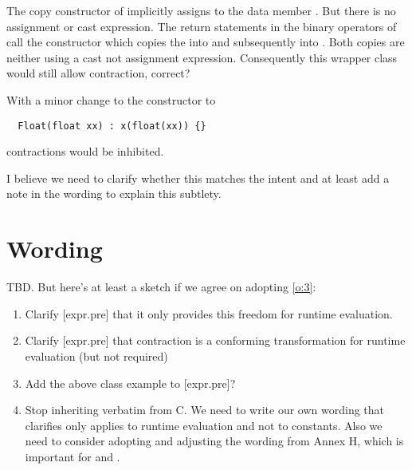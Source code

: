 The copy constructor of  implicitly assigns to the data member .
But there is no assignment or cast expression.
The return statements in the binary operators of  call the
 constructor which copies the  into 
and subsequently into .
Both copies are neither using a cast not assignment expression.
Consequently this wrapper class would still allow \fp contraction, correct?

With a minor change to the  constructor to
\medskip
\begin{lstlisting}
  Float(float xx) : x(float(xx)) {}
\end{lstlisting}
\fp contractions would be inhibited.

I believe we need to clarify whether this matches the intent and at least
add a note in the wording to explain this subtlety.



\section{Wording}

TBD.
But here's at least a sketch if we agree on adopting \ref{o:3}:

\begin{enumerate}
  \item Clarify [expr.pre] that it only provides this freedom for runtime
    evaluation.

  \item Clarify [expr.pre] that \fp contraction is a conforming transformation
    for runtime evaluation (but not required)

  \item Add the above  class example to [expr.pre]?

  \item Stop inheriting  verbatim from C.
    We need to write our own wording that clarifies  only
    applies to runtime evaluation and not to constants.
    Also we need to consider adopting and adjusting the wording from Annex H,
    which is important for  and .
\end{enumerate}


